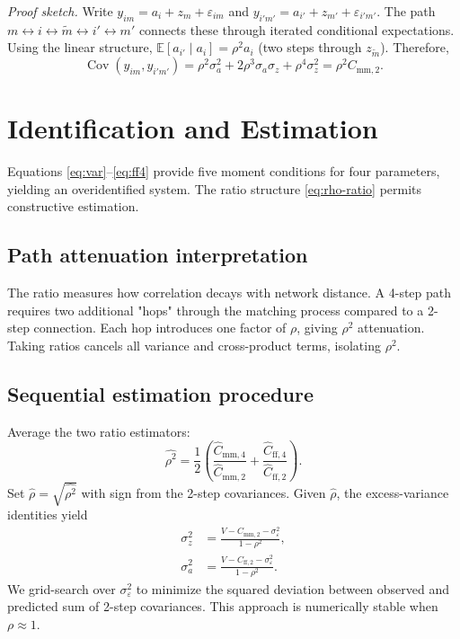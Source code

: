 \documentclass[9pt,twocolumn,twoside]{pnas-new}
\begin{document}
\textit{Proof sketch.} Write $y_{im}=a_i+z_m+\varepsilon_{im}$ and $y_{i'm'}=a_{i'}+z_{m'}+\varepsilon_{i'm'}$. The path $m \leftrightarrow i \leftrightarrow \tilde m \leftrightarrow i' \leftrightarrow m'$ connects these through iterated conditional expectations. Using the linear structure, $\mathbb{E}[a_{i'}\mid a_i] = \rho^2 a_i$ (two steps through $z_{\tilde m}$). Therefore,
\[
 \operatorname{Cov}(y_{im}, y_{i'm'}) = \rho^2\sigma_a^2 + 2\rho^3\sigma_a\sigma_z + \rho^4\sigma_z^2 = \rho^2 C_{\text{mm},2}.
\]

\section*{Identification and Estimation}

Equations \eqref{eq:var}--\eqref{eq:ff4} provide five moment conditions for four parameters, yielding an overidentified system. The ratio structure \eqref{eq:rho-ratio} permits constructive estimation.

\subsection*{Path attenuation interpretation}
The ratio measures how correlation decays with network distance. A 4-step path requires two additional "hops" through the matching process compared to a 2-step connection. Each hop introduces one factor of $\rho$, giving $\rho^2$ attenuation. Taking ratios cancels all variance and cross-product terms, isolating $\rho^2$.

\subsection*{Sequential estimation procedure}
Average the two ratio estimators:
\begin{equation}
 \widehat{\rho^2} = \frac{1}{2}\left(\frac{\widehat C_{\text{mm},4}}{\widehat C_{\text{mm},2}} + \frac{\widehat C_{\text{ff},4}}{\widehat C_{\text{ff},2}}\right).
\end{equation}
Set $\widehat\rho = \sqrt{\widehat{\rho^2}}$ with sign from the 2-step covariances. Given $\widehat\rho$, the excess-variance identities yield
\begin{align}
 \sigma_z^2 &= \frac{V - C_{\text{mm},2} - \sigma_\varepsilon^2}{1 - \rho^2}, \\
 \sigma_a^2 &= \frac{V - C_{\text{ff},2} - \sigma_\varepsilon^2}{1 - \rho^2}.
\end{align}
We grid-search over $\sigma_\varepsilon^2$ to minimize the squared deviation between observed and predicted sum of 2-step covariances. This approach is numerically stable when $\rho \approx 1$.
\end{document}
